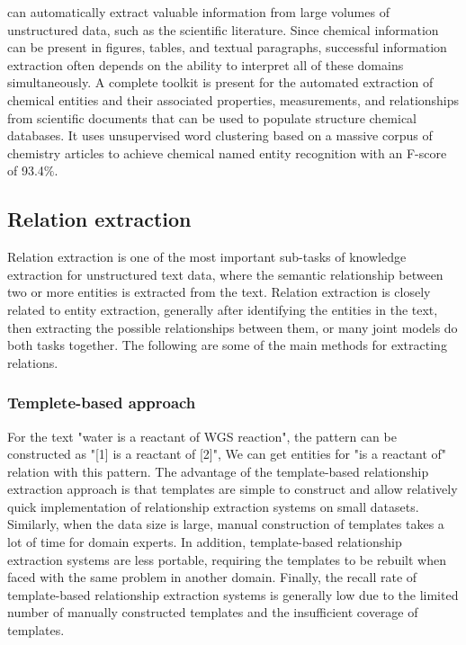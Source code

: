 \documentclass[%
 aip,
 jmp,%
 amsmath,amssymb,
 reprint,%
]{revtex4-2}
\begin{document}
can automatically extract valuable information from large volumes of unstructured
data, such as the scientific literature. Since chemical information can be present
in figures, tables, and textual paragraphs, successful information extraction often
depends on the ability to interpret all of these domains simultaneously. A complete
toolkit is present for the automated extraction of chemical entities and their associated
properties, measurements, and relationships from scientific documents that can be used
to populate structure chemical databases\cite{swain2016chemdataextractor}. It uses unsupervised word clustering based on
a massive corpus of chemistry  articles to achieve chemical named entity recognition with an 
F-score of 93.4$\%$.

\subsection{Relation extraction}
Relation extraction is one of the most important sub-tasks of knowledge extraction for 
unstructured text data, where the semantic relationship between two or more entities is extracted 
from the text. Relation extraction is closely related to entity extraction, generally after 
identifying the entities in the text, then extracting the possible relationships between them, 
or many joint models do both tasks together. The following are some of the main methods
for extracting relations.

\subsubsection{Templete-based approach}
For the text "water is a reactant of WGS reaction", the pattern can be constructed as "[1] is a reactant of [2]",
We can get entities for "is a reactant of" relation with this pattern. The advantage of the template-based relationship 
extraction approach is that templates are simple to construct and allow relatively quick implementation of relationship 
extraction systems on small datasets. Similarly, when the data size is large, manual construction of templates takes 
a lot of time for domain experts. In addition, template-based relationship extraction systems are less portable, 
requiring the templates to be rebuilt when faced with the same problem in another domain. 
Finally, the recall rate of template-based relationship extraction systems is generally low due to 
the limited number of manually constructed templates and the insufficient coverage of templates.
\end{document}
